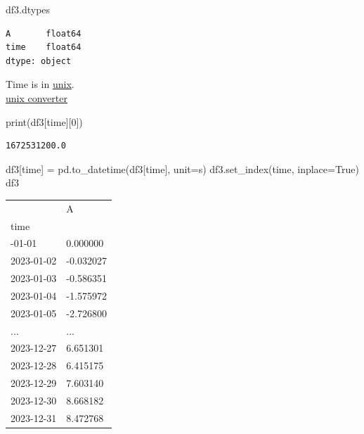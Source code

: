 \documentclass[
  letterpaper,
  DIV=11,
  numbers=noendperiod,
  oneside]{scrreprt}
\newenvironment{Shaded}{\begin{snugshade}}{\end{snugshade}}
\newcommand{\BuiltInTok}[1]{\textcolor[rgb]{0.00,0.23,0.31}{#1}}
\newcommand{\DecValTok}[1]{\textcolor[rgb]{0.68,0.00,0.00}{#1}}
\newcommand{\NormalTok}[1]{\textcolor[rgb]{0.00,0.23,0.31}{#1}}
\newcommand{\OperatorTok}[1]{\textcolor[rgb]{0.37,0.37,0.37}{#1}}
\newcommand{\StringTok}[1]{\textcolor[rgb]{0.13,0.47,0.30}{#1}}
\newcommand{\VariableTok}[1]{\textcolor[rgb]{0.07,0.07,0.07}{#1}}
\begin{document}
\begin{Shaded}
\begin{Highlighting}[]
\NormalTok{df3.dtypes}
\end{Highlighting}
\end{Shaded}

\begin{verbatim}
A       float64
time    float64
dtype: object
\end{verbatim}

Time is in \href{https://en.wikipedia.org/wiki/Unix_time}{unix}.\\
\href{https://www.epochconverter.com/}{unix converter}

\begin{Shaded}
\begin{Highlighting}[]
\BuiltInTok{print}\NormalTok{(df3[}\StringTok{\textquotesingle{}time\textquotesingle{}}\NormalTok{][}\DecValTok{0}\NormalTok{])}
\end{Highlighting}
\end{Shaded}

\begin{verbatim}
1672531200.0
\end{verbatim}

\begin{Shaded}
\begin{Highlighting}[]
\NormalTok{df3[}\StringTok{\textquotesingle{}time\textquotesingle{}}\NormalTok{] }\OperatorTok{=}\NormalTok{ pd.to\_datetime(df3[}\StringTok{\textquotesingle{}time\textquotesingle{}}\NormalTok{], unit}\OperatorTok{=}\StringTok{\textquotesingle{}s\textquotesingle{}}\NormalTok{)}
\NormalTok{df3.set\_index(}\StringTok{\textquotesingle{}time\textquotesingle{}}\NormalTok{, inplace}\OperatorTok{=}\VariableTok{True}\NormalTok{)}
\NormalTok{df3}
\end{Highlighting}
\end{Shaded}

\begin{longtable}[]{@{}ll@{}}
\toprule\noalign{}
& A \\
time & \\
\midrule\noalign{}
\endhead
\bottomrule\noalign{}
\endlastfoot
2023-01-01 & 0.000000 \\
2023-01-02 & -0.032027 \\
2023-01-03 & -0.586351 \\
2023-01-04 & -1.575972 \\
2023-01-05 & -2.726800 \\
... & ... \\
2023-12-27 & 6.651301 \\
2023-12-28 & 6.415175 \\
2023-12-29 & 7.603140 \\
2023-12-30 & 8.668182 \\
2023-12-31 & 8.472768 \\
\end{longtable}
\end{document}
